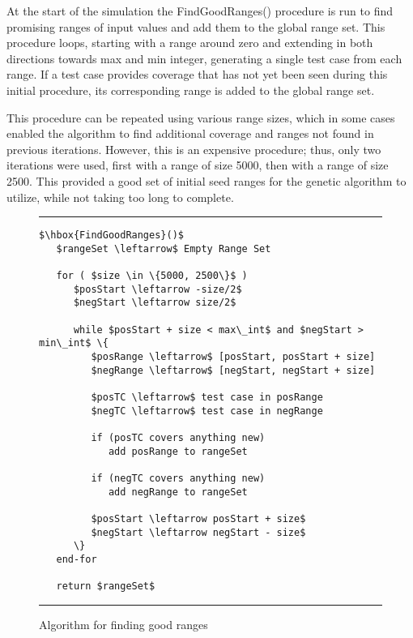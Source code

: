 \documentclass[runningheads]{llncs}
\begin{document}
At the start of the simulation the FindGoodRanges() procedure is run to find promising ranges of input values and add them to the global range set. This procedure loops, starting with a range around zero and extending in both directions towards max and min integer, generating a single test case from each range. If a test case provides coverage that has not yet been seen during this initial procedure, its corresponding range is added to the global range set. 

This procedure can be repeated using various range sizes, which in some cases enabled the algorithm to find additional coverage and ranges not found in previous iterations. However, this is an expensive procedure; thus, only two iterations were used, first with a range of size 5000, then with a range of size 2500. This provided a good set of initial seed ranges for the genetic algorithm to utilize, while not taking too long to complete.


\begin{figure}[h!]
\begin{center}
\hrule
\medskip
\begin{Verbatim}[fontfamily=tt, xleftmargin=10pt, commandchars=\\\{\},
codes={\catcode`$=3\catcode`^=7\catcode`_=8}]
$\hbox{FindGoodRanges}()$  
   $rangeSet \leftarrow$ Empty Range Set
		
   for ( $size \in \{5000, 2500\}$ ) 
      $posStart \leftarrow -size/2$
      $negStart \leftarrow size/2$
		
      while $posStart + size < max\_int$ and $negStart > min\_int$ \{
         $posRange \leftarrow$ [posStart, posStart + size]
         $negRange \leftarrow$ [negStart, negStart + size]
		
         $posTC \leftarrow$ test case in posRange
         $negTC \leftarrow$ test case in negRange
		
         if (posTC covers anything new)
            add posRange to rangeSet
		
         if (negTC covers anything new)
            add negRange to rangeSet
		
         $posStart \leftarrow posStart + size$
         $negStart \leftarrow negStart - size$
      \}
   end-for
		
   return $rangeSet$
\end{Verbatim}
\hrule
\end{center}
\caption{Algorithm for finding good ranges \label{fig:ranges}}
\end{figure}
\FloatBarrier
\end{document}
